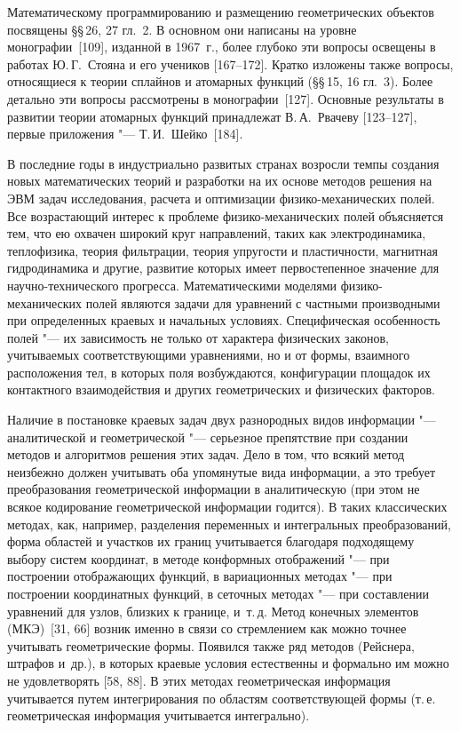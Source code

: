 Математическому программированию и размещению геометрических объектов
посвящены \S\S\,26, 27 гл.~2. В основном они написаны на уровне
монографии~[109], изданной в 1967~г., более глубоко эти вопросы освещены
в работах Ю.\,Г.~Стояна и его учеников [167--172]. Кратко изложены также
вопросы, относящиеся к теории сплайнов и атомарных функций (\S\S\,15, 16
гл.~3). Более детально эти вопросы рассмотрены в монографии~[127]. Основные
результаты в развитии теории атомарных функций принадлежат В.\,А.~Рвачеву
[123--127], первые приложения "--- Т.\,И.~Шейко~[184].

В последние годы в индустриально развитых странах возросли темпы создания
новых математических теорий и разработки на их основе методов решения на ЭВМ
задач исследования, расчета и оптимизации физико-механических полей. Все
возрастающий интерес к проблеме физико-механических полей объясняется тем,
что ею охвачен широкий круг направлений, таких как электродинамика,
теплофизика, теория фильтрации, теория упругости и пластичности, магнитная
гидродинамика и другие, развитие которых имеет первостепенное значение для
научно-технического прогресса. Математическими моделями физико-механических
полей являются задачи для уравнений с частными производными при
определенных краевых и начальных условиях. Специфическая особенность полей
"--- их зависимость не только от характера физических законов, учитываемых
соответствующими уравнениями, но и от формы, взаимного расположения тел,
в которых поля возбуждаются, конфигурации площадок их контактного
взаимодействия и других геометрических и физических факторов.

Наличие в постановке краевых задач двух разнородных видов информации "---
аналитической и геометрической "--- серьезное препятствие при создании
методов и алгоритмов решения этих задач. Дело в том, что всякий метод
неизбежно должен учитывать оба упомянутые вида информации, а это требует
преобразования геометрической информации в аналитическую (при этом не всякое
кодирование геометрической информации годится). В таких классических
методах, как, например, разделения переменных и интегральных преобразований,
форма областей и участков их границ учитывается благодаря подходящему выбору
систем координат, в методе конформных отображений "--- при построении
отображающих функций, в вариационных методах "--- при построении
координатных функций, в сеточных методах "--- при составлении уравнений
для узлов, близких к границе, и~т.\,д. Метод конечных элементов
(МКЭ)~[31, 66] возник именно в связи со стремлением как
%
можно точнее учитывать геометрические формы. Появился также ряд методов
(Рейснера, штрафов и~др.), в которых краевые условия естественны и
формально им можно не удовлетворять [58, 88]. В этих методах геометрическая
информация учитывается путем интегрирования по областям соответствующей
формы (т.\,е. геометрическая информация учитывается интегрально).


